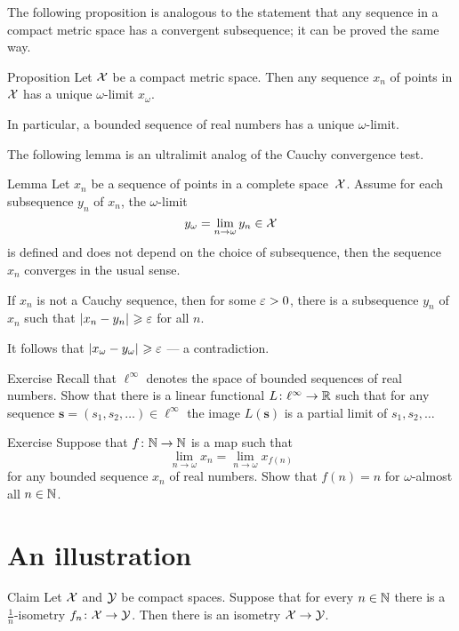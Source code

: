 The following proposition 
is analogous to the statement that any sequence in a compact metric space 
has a convergent subsequence;
it can be proved the same way.

\begin{thm}{Proposition}\label{prop:ultra/compact}
Let $\mathcal{X}$ be a compact metric space.
Then
any sequence $x_n$ of points in $\mathcal{X}$ has a unique $\omega$-limit $x_\omega$.

In particular, a bounded sequence of real numbers has a unique $\omega$-limit.
\end{thm}

The following lemma is an ultralimit analog of the Cauchy convergence test.

\begin{thm}{Lemma}\label{lem:X-X^w}
Let $x_n$ be a sequence of points in a complete space~$\mathcal{X}$. 
Assume for each subsequence $y_n$ of $x_n$, 
the $\omega$-limit 
\[y_\omega=\lim_{n\to\omega}y_{n}\in \mathcal{X}\]
is defined and does not depend on the choice of subsequence, then the sequence $x_n$ converges in the usual sense.
\end{thm}

 If $x_n$ is not a Cauchy sequence, then for some $\varepsilon>0$, there is a subsequence $y_n$ of $x_n$ such that $\dist{x_n}{y_n}{}\ge\eps$ for all $n$.

It follows that $\dist{x_\omega}{y_\omega}{}\ge \eps$ --- a contradiction.\qeds

\begin{thm}{Exercise}\label{ex:linear}
Recall that $\ell^\infty$ denotes the space of bounded sequences of real numbers.
Show that there is a linear functional $L\colon\ell^\infty\to\mathbb{R}$ such that
for any sequence $\bm{s}=(s_1,s_2,\dots)\in \ell^\infty$ the image $L(\bm{s})$ is a partial limit of $s_1,s_2,\dots$
\end{thm}

\begin{thm}{Exercise}\label{ex:ultrakatetov+}
Suppose that $f\colon\mathbb{N}\to\mathbb{N}$ is a map such that 
\[\lim_{n\to\omega}x_n=\lim_{n\to\omega}x_{f(n)}\]
for any bounded sequence $x_n$ of real numbers.
Show that $f(n)=n$ for $\omega$-almost all $n\in\mathbb{N}$.
\end{thm}

\section{An illustration}

\begin{thm}{Claim}
Let $\mathcal{X}$ and $\mathcal{Y}$ be compact spaces.
Suppose that for every $n\in\mathbb{N}$ there is a $\tfrac1n$-isometry $f_n\colon\mathcal{X}\to \mathcal{Y}$.
Then there is an isometry $\mathcal{X}\to \mathcal{Y}$.
\end{thm}

